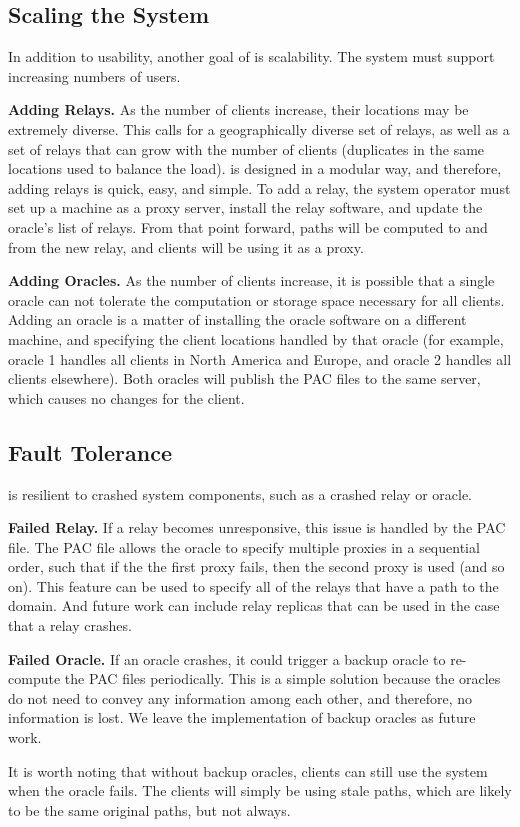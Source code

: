 \subsection{Scaling the System}
In addition to usability, another goal of \system{} is scalability.  The system 
must support increasing numbers of users.  

{\bf Adding Relays.} As the number of clients increase, their locations may be 
extremely diverse. This calls for a geographically diverse set of relays, as 
well as a set of relays that can grow with the number of clients (duplicates in 
the same locations used to balance the load).  \system{} is 
designed in a modular way, and therefore, adding relays is quick, easy, and 
simple.  To add a relay, the system operator must set up a machine as a proxy 
server, install the \system{} relay software, and update the oracle's list of 
relays.  From that point forward, paths will be computed to and from the new 
relay, and clients will be using it as a proxy.  

{\bf Adding Oracles.} As the number of clients increase, it is possible that a 
single oracle can not tolerate the computation or storage space necessary for 
all clients.  Adding an oracle is a matter of installing the oracle software on 
a different machine, and specifying the client locations handled by that oracle 
(for example, oracle 1 handles all clients in North America and Europe, and 
oracle 2 handles all clients elsewhere).  Both oracles will publish the PAC files 
to the same server, which causes no changes for the client.

\subsection{Fault Tolerance}
\system{} is resilient to crashed system components, such as a crashed relay or 
oracle.  

{\bf Failed Relay.} If a relay becomes unresponsive, this issue is handled by 
the PAC file.  The PAC file allows the oracle to specify multiple proxies in 
a sequential order, such that if the the first proxy fails, then the second 
proxy is used (and so on).  This feature can be used to specify all of the 
relays that have a path to the domain.  And future work can include relay 
replicas that can be used in the case that a relay crashes.

{\bf Failed Oracle.} If an oracle crashes, it could trigger a backup oracle 
to re-compute the PAC files periodically.  This is a simple solution because 
the oracles do not need to convey any information among each other, and therefore, 
no information is lost.  We leave the implementation of backup oracles as future 
work.

It is worth noting that without backup oracles, clients can still use the system 
when the oracle fails.  The clients will simply be using stale paths, which are 
likely to be the same original paths, but not always.  


